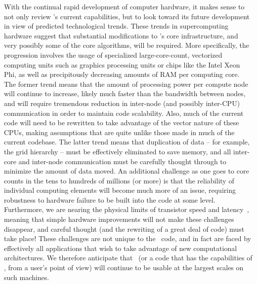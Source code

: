 With the continual rapid development of computer hardware, it makes
sense to not only review \enzo's current capabilities, but to look
toward its future development in view of predicted technological
trends. These trends in supercomputing hardware suggest that
substantial modifications to \enzo's core infrastructure, and very
possibly some of the core algorithms, will be required. More
specifically, the progression involves the usage of specialized
large-core-count, vectorized computing units such as graphics
processing units or chips like the Intel Xeon Phi, as well as
precipitously decreasing amounts of RAM per computing core.  The
former trend means that the amount of processing power per compute
node will continue to increase, likely much faster than the bandwidth
between nodes, and will require tremendous reduction in inter-node
(and possibly inter-CPU) communication in order to maintain code
scalability.  Also, much of the current code will need to be rewritten
to take advantage of the vector nature of these CPUs, making
assumptions that are quite unlike those made in much of the current
codebase.  The latter trend means that duplication of data -- for
example, the grid hierarchy -- must be effectively eliminated to save
memory, and all inter-core and inter-node communication must be
carefully thought through to minimize the amount of data moved.  An
additional challenge as one goes to core counts in the tens to
hundreds of millions (or more) is that the reliability of individual
computing elements will become much more of an issue, requiring
robustness to hardware failure to be built into the code at some
level.  Furthermore, we are nearing the physical limits of transistor
speed and latency~\citep{feynman1999feynman}, meaning that simple
hardware improvements will not make these challenges disappear, and
careful thought (and the rewriting of a great deal of code) must take
place!  These challenges are not unique to the \enzo\ code, and in
fact are faced by effectively all applications that wish to take
advantage of new computational architectures. We therefore anticipate
that \enzo\ (or a code that has the capabilities of \enzo, from a
user's point of view) will continue to be usable at the
largest scales on such machines.


